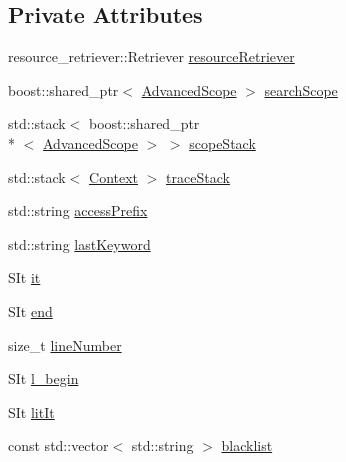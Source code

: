 \subsection*{Private Attributes}
\begin{DoxyCompactItemize}
\item 
resource\-\_\-retriever\-::\-Retriever \hyperlink{classgiskard__suturo_1_1GiskardPPParser_a6ae65d54b237bd3321091310825b702b}{resource\-Retriever}
\item 
boost\-::shared\-\_\-ptr$<$ \hyperlink{classgiskard__suturo_1_1AdvancedScope}{Advanced\-Scope} $>$ \hyperlink{classgiskard__suturo_1_1GiskardPPParser_a63fc104102b073b0a5f9dfa1fa93eea3}{search\-Scope}
\item 
std\-::stack$<$ boost\-::shared\-\_\-ptr\\*
$<$ \hyperlink{classgiskard__suturo_1_1AdvancedScope}{Advanced\-Scope} $>$ $>$ \hyperlink{classgiskard__suturo_1_1GiskardPPParser_ae8670c50103c477e9a3a1774bcd0cfbc}{scope\-Stack}
\item 
std\-::stack$<$ \hyperlink{structgiskard__suturo_1_1GiskardPPParser_1_1Context}{Context} $>$ \hyperlink{classgiskard__suturo_1_1GiskardPPParser_a27bec9e4c3824a46126cce10474b0c97}{trace\-Stack}
\item 
std\-::string \hyperlink{classgiskard__suturo_1_1GiskardPPParser_aab4e3732ffd6ad76e3915e17b3655b0c}{access\-Prefix}
\item 
std\-::string \hyperlink{classgiskard__suturo_1_1GiskardPPParser_ad6743dbba552509d2d55cdb874ac7e76}{last\-Keyword}
\item 
S\-It \hyperlink{classgiskard__suturo_1_1GiskardPPParser_a7dee6cfbff88604796d7968fc190e810}{it}
\item 
S\-It \hyperlink{classgiskard__suturo_1_1GiskardPPParser_a22435e6cc45304914888b6c53b3eeb17}{end}
\item 
size\-\_\-t \hyperlink{classgiskard__suturo_1_1GiskardPPParser_ae4a702a812d943e99e67ffa7da455ec9}{line\-Number}
\item 
S\-It \hyperlink{classgiskard__suturo_1_1GiskardPPParser_ab1fa470eaed886d6ff52f85fe8618c7f}{l\-\_\-begin}
\item 
S\-It \hyperlink{classgiskard__suturo_1_1GiskardPPParser_aad16704f4a92d18367568749642da53a}{lit\-It}
\item 
const std\-::vector$<$ std\-::string $>$ \hyperlink{classgiskard__suturo_1_1GiskardPPParser_a23c7988ac4807b6c10ff00bd4f340b9e}{blacklist}
\end{DoxyCompactItemize}


